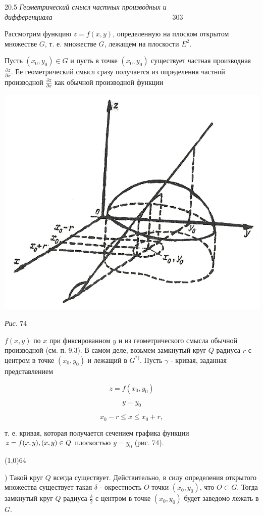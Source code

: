 \documentclass[a4paper,12pt]{book}
\begin{document}
\fontsize{14pt}{14pt}\selectfont
\parindent=0.0cm
{\small 20.5 \textit{Геометрический смысл частных производных и дифференциала}\ \ \ \ \ \ \ \ \ \ \ \ \ \ \ \ \ \ \ \ \ \ \ \ \ \ \ \ \ \ \ \ \ \ 303}\par
\vspace{1.5em}
\parindent=0.7cm
Рассмотрим функцию $z=f(x, y)$, определенную на плоском открытом множестве $G$, т. е. множестве $G$, лежащем на плоскости $E^2$.\par
\parindent=0.0cm
Пусть $(x_0,y_0) \in G$ и пусть в точке $(x_0,y_0)$ существует частная производная $\frac{\partial z}{\partial x}$. Ее геометрический смысл сразу получается из определения частной производной $\frac{\partial z}{\partial x}$ как обычной производной функции\par
\begin{center}
\includegraphics[scale=1.5]{grafik.png}\par
{\small \textit{Рис}. 74}\par
\end{center}
$f(x,y)$ по $x$ при фиксированном $y$ и из геометрического смысла обычной производной (см. п. 9.3). В самом деле, возьмем замкнутый круг $Q$ радиуса $r$ с центром в точке $(x_0,y_0)$ и лежащий в $G^{*)}$. Пусть $\gamma$ - кривая, заданная представлением\par
$$
z=f(x_0,y_0)
$$\par
$$
y=y_0
$$\par
$$
x_0-r \leq x \leq x_0+r,
$$\par
т. е. кривая, которая получается сечением графика функции $z=f(x,y), (x,y) \\
\in Q$ плоскостью $y=y_0$ (рис. 74).\par
\line(1,0){64}\par
\parindent=0.7cm
{\small *) Такой круг $Q$ всегда существует. Действительно, в силу определения открытого множества существует такая $\delta$ - окрестность $O$ точки $(x_0,y_0)$, что $O \subset G$. Тогда замкнутый круг $Q$ радиуса $\frac{\delta}{2}$ с центром в точке $(x_0,y_0)$ будет заведомо лежать в $G$.
}
\end{document}
